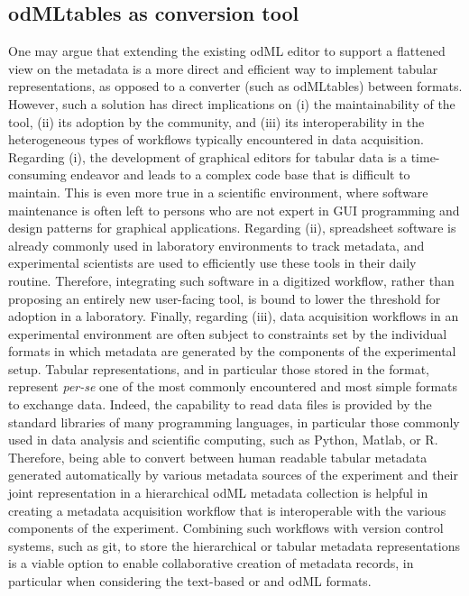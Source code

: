 \subsection{odMLtables as conversion tool}
One may argue that extending the existing odML editor to support a flattened view on the metadata is a more direct and efficient way to implement tabular representations, as opposed to a converter (such as odMLtables) between formats. However, such a solution has direct implications on (i) the maintainability of the tool, (ii) its adoption by the community, and (iii) its interoperability in the heterogeneous types of workflows typically encountered in data acquisition. Regarding (i), the development of graphical editors for tabular data  is a time-consuming endeavor and leads to a complex code base that is difficult to maintain. This is even more true in a scientific environment, where software maintenance is often left to persons who are not expert in GUI programming and design patterns for graphical applications. Regarding (ii), spreadsheet software is already commonly used in laboratory environments to track metadata, and experimental scientists are used to efficiently use these tools in their daily routine. Therefore, integrating such software in a digitized workflow, rather than proposing an entirely new user-facing tool, is bound to lower the threshold for adoption in a laboratory. Finally, regarding (iii), data acquisition workflows in an experimental environment are often subject to constraints set by the individual formats in which metadata are generated by the components of the experimental setup. Tabular representations, and in particular those stored in the  format, represent \textit{per-se} one of the most commonly encountered and most simple formats to exchange data. Indeed, the capability to read  data files is provided by the standard libraries of many programming languages, in particular those commonly used in data analysis and scientific computing, such as Python, Matlab, or R. Therefore, being able to convert between human readable tabular metadata generated automatically by various metadata sources of the experiment and their joint representation in a hierarchical odML metadata collection is helpful in creating a metadata acquisition workflow that is interoperable with the various components of the experiment. Combining such workflows with version control systems, such as git, to store the hierarchical or tabular metadata representations is a viable option to enable collaborative creation of metadata records, in particular when considering the text-based  or and odML formats.

